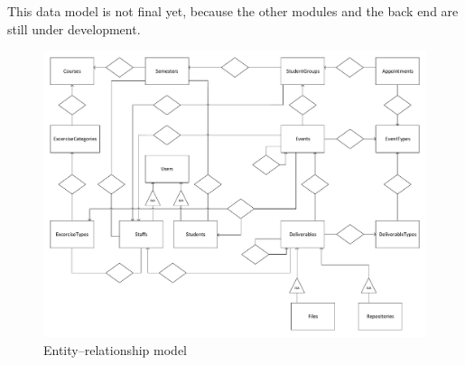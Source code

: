 This data model is not final yet, because the other modules and the back end are still under development. 

\begin{landscape}
	
	\begin{figure}[!htbp]
		\centering
		\includegraphics[width=1.3\textheight]{figures/ER.pdf}
		\caption[Entity–relationship model]{Entity–relationship model}
		\label{fig:er}
	\end{figure}
\end{landscape}



